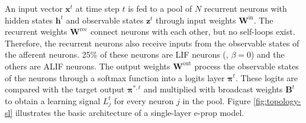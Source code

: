         An input vector $\mathbf{x}^t$ at time step $t$ is fed to a pool of $N$ recurrent neurons with hidden states $\mathbf{h}^t$ and observable states $\mathbf{z}^t$ through input weights $\mathbf{W}^\text{in}$.
        The recurrent weights $\mathbf{W}^\text{rec}$ connect neurons with each other, but no self-loops exist.
        Therefore, the recurrent neurons also receive inputs from the observable states of the afferent neurons.
        25\% of these neurons are LIF neurons (\ie, $\beta = 0$) and the others are ALIF neurons.
        The output weights $\mathbf{W}^\text{out}$ process the observable states of the neurons through a softmax function into a logits layer $\mathbf{\pi}^t$.
        These logits are compared with the target output $\mathbf{\pi}^{*, t}$ and multiplied with broadcast weights $\mathbf{B}^t$ to obtain a learning signal $L_j^t$ for every neuron $j$ in the pool.
        Figure \ref{fig:topology-sl} illustrates the basic architecture of a single-layer e-prop model.
